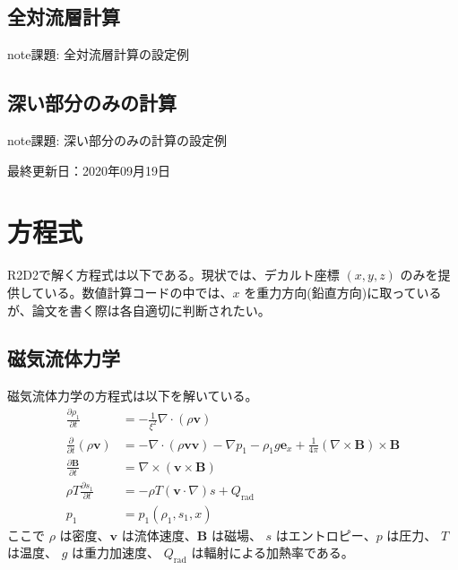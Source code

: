 \documentclass[letterpaper,10pt,dvipdfmx,report]{sphinxmanual}
\begin{document}
\section{全対流層計算}
\label{\detokenize{typical_case:id6}}
\begin{sphinxadmonition}{note}{\label{\detokenize{typical_case:id7}}課題:}
全対流層計算の設定例
\end{sphinxadmonition}


\section{深い部分のみの計算}
\label{\detokenize{typical_case:id8}}
\begin{sphinxadmonition}{note}{\label{\detokenize{typical_case:id9}}課題:}
深い部分のみの計算の設定例
\end{sphinxadmonition}

最終更新日：2020年09月19日


\chapter{方程式}
\label{\detokenize{equation:id1}}\label{\detokenize{equation::doc}}
R2D2で解く方程式は以下である。現状では、デカルト座標 \((x,y,z)\)  のみを提供している。数値計算コードの中では、\(x\) を重力方向(鉛直方向)に取っているが、論文を書く際は各自適切に判断されたい。


\section{磁気流体力学}
\label{\detokenize{equation:id2}}
磁気流体力学の方程式は以下を解いている。
\begin{equation*}
\begin{split}\frac{\partial \rho_1}{\partial t} &= - \frac{1}{\xi^2}\nabla\cdot
\left(\rho \boldsymbol{v}\right) \\
\frac{\partial}{\partial t}\left(\rho \boldsymbol{v}\right) &=
-\nabla\cdot\left(\rho\boldsymbol{vv}\right)
- \nabla p_1 - \rho_1 g\boldsymbol{e}_x
+\frac{1}{4\pi}\left(\nabla\times\boldsymbol{B}\right)
\times\boldsymbol{B} \\
\frac{\partial \boldsymbol{B}}{\partial t} &=
\nabla\times\left(\boldsymbol{v\times B}\right)
\\
\rho T \frac{\partial s_1}{\partial t} &= -\rho T
\left(\boldsymbol{v}\cdot\nabla\right) s + Q_\mathrm{rad} \\
p_1 &= p_1(\rho_1,s_1,x)\end{split}
\end{equation*}
ここで \(\rho\) は密度、\(\boldsymbol{v}\) は流体速度、\(\boldsymbol{B}\) は磁場、 \(s\) はエントロピー、\(p\) は圧力、 \(T\) は温度、 \(g\) は重力加速度、 \(Q_\mathrm{rad}\) は輻射による加熱率である。
\end{document}
